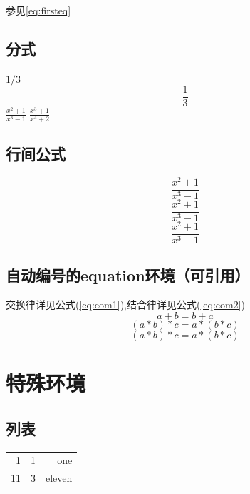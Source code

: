 \documentclass{article}
\begin{document}
	参见\ref{eq:firsteq}
	
	\subsection{分式}
	$1/3$ $$\frac{1}{3}$$ 
	$\frac{x^2+1}{x^3-1}$
	\begin{math}
		\frac{x^3+1}{x^4+2}
	\end{math}\\

	\subsection{行间公式}
	$$\frac{x^2+1}{x^3-1}$$
	\[\frac{x^2+1}{x^3-1}\]
	\begin{displaymath}
		\frac{x^2+1}{x^3-1}
	\end{displaymath}
	
	\subsection{自动编号的equation环境（可引用）}
	交换律详见公式(\ref{eq:com1}),结合律详见公式(\ref{eq:com2})
	\begin{equation}
		a+b=b+a\label{eq:com1}
	\end{equation}
	\begin{equation}
	(a*b)*c=a*(b*c)\label{eq:com2}
	\end{equation}
	\begin{equation*}
	(a*b)*c=a*(b*c)
	\end{equation*}
	
	\section{特殊环境}
	
	\subsection{列表}
	\begin{center}
	\begin{tabular}{| @{~: } |r| @{~: } |l| |r|@{}|}
	\hline \hline
	1 & 1 & one\\
	11& 3 & eleven\\
	\hline
	\end{tabular}
	\end{center}
	
\end{document}
